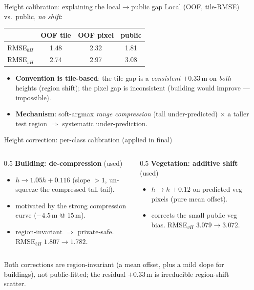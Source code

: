 \documentclass[aspectratio=169,11pt]{beamer}
\begin{document}
\begin{frame}{Height calibration: explaining the local$\to$public gap}
  Local (OOF, tile-RMSE) vs.\ public, \emph{no shift}:
  \begin{center}\small
  \begin{tabular}{lccc}
    \toprule
    & OOF tile & OOF pixel & public\\
    \midrule
    RMSE$_{bH}$ & 1.48 & 2.32 & 1.81\\
    RMSE$_{vH}$ & 2.74 & 2.97 & 3.08\\
    \bottomrule
  \end{tabular}
  \end{center}
  \begin{itemize}\small
    \item \textbf{Convention is tile-based}: the tile gap is a \emph{consistent}
      $+0.33$\,m on \emph{both} heights (region shift); the pixel gap is
      inconsistent (building would improve --- impossible).
    \item \textbf{Mechanism}: soft-argmax \emph{range compression} (tall
      under-predicted) $\times$ a taller test region $\Rightarrow$ systematic
      under-prediction.
  \end{itemize}
\end{frame}

\begin{frame}{Height correction: per-class calibration (applied in final)}
  \begin{columns}[T]
    \begin{column}{0.5\textwidth}
      \textbf{Building: de-compression} \textcolor{cHead}{(used)}
      \begin{itemize}\small
        \item $h\!\to\!1.05h+0.116$ (slope $>1$, un-squeeze the compressed tall tail).
        \item motivated by the strong compression curve ($-4.5$\,m @ 15\,m).
        \item region-invariant $\Rightarrow$ private-safe. RMSE$_{bH}$ $1.807\!\to\!1.782$.
      \end{itemize}
    \end{column}
    \begin{column}{0.5\textwidth}
      \textbf{Vegetation: additive shift} \textcolor{cHead}{(used)}
      \begin{itemize}\small
        \item $h\!\to\!h+0.12$ on predicted-veg pixels (pure mean offset).
        \item corrects the small public veg bias. RMSE$_{vH}$ $3.079\!\to\!3.072$.
      \end{itemize}
    \end{column}
  \end{columns}
  \vspace{0.3em}
  {\footnotesize Both corrections are region-invariant (a mean offset, plus a mild
   slope for buildings), not public-fitted; the residual $+0.33$\,m is irreducible
   region-shift scatter.}
\end{frame}
\end{document}
